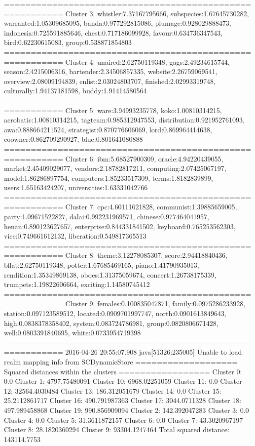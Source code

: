 ========================================================= 
Cluster 3| whistler:7.37167795666, subspecies:1.67645730282, warranted:1.05309685095, banda:0.977292815086, plumage:0.928029888473, indonesia:0.725591885646, chest:0.717186099928, favour:0.634736347543, bird:0.62230615083, group:0.538871854803
========================================================= 
Cluster 4| unaired:2.62750119348, gags:2.49234615744, season:2.4215006316, bartender:2.34506857335, website:2.26759069541, overview:2.08009194839, enlist:2.03024803707, finished:2.02993319748, culturally:1.94137181598, buddy:1.91414580564
========================================================= 
Cluster 5| ware:3.94993235778, koko:1.00810314215, acrobatic:1.00810314215, tagteam:0.985312947553, distribution:0.921952761093, awa:0.888664211524, strategist:0.870776606069, lord:0.869964414638, coowner:0.862709290927, blue:0.801641080888
========================================================= 
Cluster 6| ibm:5.68527900309, oracle:4.94220439055, market:2.45409029077, vendors:2.18782817211, computing:2.07425067197, model:1.86286897754, computers:1.85233517309, terms:1.8182839899, users:1.65163424207, universities:1.63331042766
========================================================= 
Cluster 7| cpc:4.60111621828, communist:1.39885659005, party:1.09671522827, dalai:0.992231969571, chinese:0.977464041957, henan:0.890123627657, enterprise:0.844331841502, keyboard:0.765253562303, vice:0.749661612132, liberation:0.549817365513
========================================================= 
Cluster 8| theme:3.12278085307, score:2.94418840436, bflat:2.62750119348, potter:1.67685469165, piano:1.41790935013, rendition:1.35349869138, oboes:1.31375059674, concert:1.26738175339, trumpets:1.19822606664, exciting:1.14580745412
========================================================= 
Cluster 9| females:0.100835047871, family:0.0975286233928, station:0.097123589512, located:0.0909701997747, north:0.0901613849643, high:0.0838378358402, system:0.083724786981, group:0.0820806671428, well:0.0803391840695, white:0.0733954719398
========================================================= 
2016-04-26 20:55:07.908 java[51326:235005] Unable to load realm mapping info from SCDynamicStore
=================== Squared distances within the clusters =================
Cluster 0: 0.0
Cluster 1: 4797.75480091
Cluster 10: 6968.02251059
Cluster 11: 0.0
Cluster 12: 32564.4030484
Cluster 13: 186.312051679
Cluster 14: 0.0
Cluster 15: 25.2112861717
Cluster 16: 490.791987363
Cluster 17: 3044.0711328
Cluster 18: 497.989458868
Cluster 19: 990.856909094
Cluster 2: 142.392047283
Cluster 3: 0.0
Cluster 4: 0.0
Cluster 5: 31.3611872157
Cluster 6: 0.0
Cluster 7: 43.3020967197
Cluster 8: 28.1820360294
Cluster 9: 93304.1247464
Total squared distance: 143114.7753
